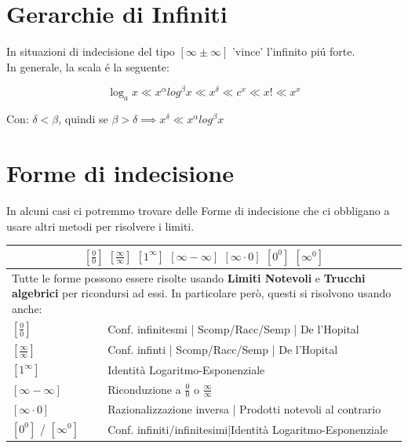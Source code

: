 \documentclass[12pt, a4paper, openany]{book}
\begin{document}
\pagebreak

\section{Gerarchie di Infiniti}
In situazioni di indecisione del tipo $[\infty \pm \infty]$ 'vince' l'infinito piú forte.
\\In generale, la scala é la seguente:

\begin{center}
	\[ \log_ax\ll x^{\alpha} log^{\beta} x \ll x^{\delta}\ll c^x\ll x! \ll x^x \]
\end{center}
Con: $\delta < \beta$, quindi se $\beta > \delta \implies x^{\delta} \ll x^{\alpha} log^{\beta} x $

\section{Forme di indecisione}
In alcuni casi ci potremmo trovare delle Forme di indecisione che ci obbligano a usare altri metodi per risolvere i limiti.\\
\begin{tabularx}{\textwidth}{|l|X|}
	\hline
	\multicolumn{2}{|c|}{
		$[\frac{0}{0}]$ $[\frac{\infty}{\infty}]$ $[1^\infty]$ $[\infty - \infty]$ $[\infty \cdot 0]$ $[0^0]$ $[\infty^0]$
	}                                                                                       \\
	\hline
	\multicolumn{2}{|X|}{
		\small{Tutte le forme possono essere risolte usando \textbf{Limiti Notevoli} e \textbf{Trucchi algebrici} per ricondursi ad essi.
			In particolare però, questi si risolvono usando anche:}
	}                                                                                       \\
	\hline
	$[\frac{0}{0}]$           & Conf. infinitesmi | Scomp/Racc/Semp | De l'Hopital          \\
	\hline
	$[\frac{\infty}{\infty}]$ & Conf. infinti | Scomp/Racc/Semp | De l'Hopital              \\
	\hline
	$[1^\infty]$              & Identità Logaritmo-Esponenziale                             \\
	\hline
	$[\infty - \infty]$       & Riconduzione a $\frac{0}{0}$ o $\frac{\infty}{\infty}$      \\
	\hline
	$[\infty \cdot 0]$        & Razionalizzazione inversa | Prodotti notevoli al contrario  \\
	\hline
	$[0^0]$ / $[\infty^0]$    & Conf. infiniti/infinitesimi|Identità Logaritmo-Esponenziale \\
	\hline
\end{tabularx}
\end{document}
